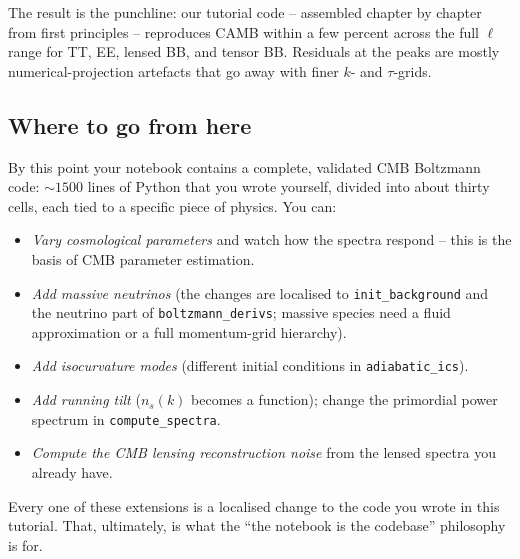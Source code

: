 \noindent The result is the punchline: our tutorial code -- assembled chapter by chapter from first principles -- reproduces CAMB within a few percent across the full $\ell$ range for TT, EE, lensed BB, and tensor BB. Residuals at the peaks are mostly numerical-projection artefacts that go away with finer $k$- and $\tau$-grids.

\subsection{Where to go from here}

By this point your notebook contains a complete, validated CMB Boltzmann code: $\sim 1500$ lines of Python that you wrote yourself, divided into about thirty cells, each tied to a specific piece of physics. You can:
\begin{itemize}
  \item \emph{Vary cosmological parameters} and watch how the spectra respond -- this is the basis of CMB parameter estimation.
  \item \emph{Add massive neutrinos} (the changes are localised to \texttt{init\_background} and the neutrino part of \texttt{boltzmann\_derivs}; massive species need a fluid approximation or a full momentum-grid hierarchy).
  \item \emph{Add isocurvature modes} (different initial conditions in \texttt{adiabatic\_ics}).
  \item \emph{Add running tilt} ($n_s(k)$ becomes a function); change the primordial power spectrum in \texttt{compute\_spectra}.
  \item \emph{Compute the CMB lensing reconstruction noise} from the lensed spectra you already have.
\end{itemize}
Every one of these extensions is a localised change to the code you wrote in this tutorial. That, ultimately, is what the ``the notebook is the codebase'' philosophy is for.

